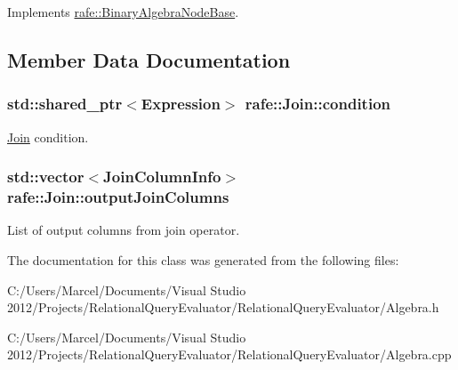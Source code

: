 Implements \hyperlink{classrafe_1_1_binary_algebra_node_base_a0c9c2fdbd7062bf0bf4587b9abc493b2}{rafe\+::\+Binary\+Algebra\+Node\+Base}.



\subsection{Member Data Documentation}
\hypertarget{classrafe_1_1_join_a77107b49ea977bec841828886bbad392}{
\subsubsection[{condition}]{\setlength{\rightskip}{0pt plus 5cm}std\+::shared\+\_\+ptr$<${\bf Expression}$>$ rafe\+::\+Join\+::condition}}\label{classrafe_1_1_join_a77107b49ea977bec841828886bbad392}
\hyperlink{classrafe_1_1_join}{Join} condition. \hypertarget{classrafe_1_1_join_aea03cf876f6e1b4eab27c07492e103bf}{
\subsubsection[{output\+Join\+Columns}]{\setlength{\rightskip}{0pt plus 5cm}std\+::vector$<${\bf Join\+Column\+Info}$>$ rafe\+::\+Join\+::output\+Join\+Columns}}\label{classrafe_1_1_join_aea03cf876f6e1b4eab27c07492e103bf}
List of output columns from join operator. 

The documentation for this class was generated from the following files\+:\begin{DoxyCompactItemize}
\item 
C\+:/\+Users/\+Marcel/\+Documents/\+Visual Studio 2012/\+Projects/\+Relational\+Query\+Evaluator/\+Relational\+Query\+Evaluator/Algebra.\+h\item 
C\+:/\+Users/\+Marcel/\+Documents/\+Visual Studio 2012/\+Projects/\+Relational\+Query\+Evaluator/\+Relational\+Query\+Evaluator/Algebra.\+cpp\end{DoxyCompactItemize}
